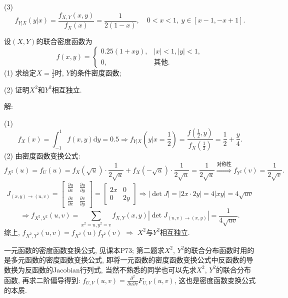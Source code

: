 \documentclass[standard]{ExBook}
\renewenvironment{shaded}{%
  \def\FrameCommand{\fboxsep=\FrameSep \colorbox{shadecolor}}%
  \MakeFramed{\advance\hsize-\width \FrameRestore}%
}{%
  \endMakeFramed
}
\begin{document}
\begin{qitems}
(3) $$f_{Y|X}(y|x)=\frac{f_{X,Y}(x,y)}{f_{X}(x)}=\frac{1}{2(1-x)},\quad 0<x<1,\ y\in[x-1,-x+1].$$

\vspace{2.5cm-5em}

    \begin{bbox}
    \begin{shaded}
        \qitem
设$(X,Y)$的联合密度函数为
$$
    f(x,y)=
    \left\{
    \begin{array}{ll}
        0.25(1+xy), &|x|<1,|y|<1,\\
        0, & \text{其他}.
    \end{array}
    \right.
$$
(1) 求给定$X=\displaystyle\frac{1}{2}$时, $Y$的条件密度函数;

(2) 证明$X^2$和$Y^2$相互独立.
    \end{shaded}
    \end{bbox}

\vspace{\dimexpr2.5cm-5em\relax}

解: 

(1)
$$f_{X}(x)=\int_{-1}^{1}f(x,y)\mathrm{d}y=0.5 \Longrightarrow f_{Y|X}(y|x=\frac{1}{2})=\frac{f(\frac{1}{2},y)}{f_{X}(\frac{1}{2})}=\frac{1}{2}+\frac{y}{4}.$$
(2) 由密度函数变换公式:
$$f_{X^2}(u)=f_{U}(u)=f_{X}(\sqrt{u})\cdot\frac{1}{2\sqrt{u}}+f_{X}(-\sqrt{u})\cdot\frac{1}{2\sqrt{u}}=\frac{1}{2\sqrt{u}} \overset{\text{对称性}}{\Longrightarrow} f_{Y^2}(v)=\frac{1}{2\sqrt{v}}.$$
\[
J_{(x,y)\to(u,v)} = 
\begin{bmatrix}
\frac{\partial u}{\partial x} & \frac{\partial u}{\partial y} \\
\frac{\partial v}{\partial x} & \frac{\partial v}{\partial y}
\end{bmatrix}
=
\begin{bmatrix}
2x & 0 \\
0 & 2y
\end{bmatrix}
\Longrightarrow |\det J| = |2x \cdot 2y| = 4|xy| = 4\sqrt{uv}
\]
\[
\Longrightarrow
f_{X^2,Y^2}(u,v)=\sum\limits_{x^2=u,y^2=v}f_{X,Y}(x,y)|\det J_{(u,v)\to(x,y)}|=\frac{1}{4\sqrt{uv}}.
\]
综上, $f_{X^2,Y^2}(u,v)=f_{X^2}(u)f_{Y^2}(v)$ $\Longrightarrow$ $X^2$与$Y^2$相互独立.

\textcolor{themeColor}{\selectfont {} 一元函数的密度函数变换公式, 见课本P73; 第二题求$X^2$, $Y^2$的联合分布函数时用的是多元函数的密度函数变换公式, 即将一元函数的密度函数变换公式中反函数的导数换为反函数的Jacobian行列式, 当然不熟悉的同学也可以先求$X^2$, $Y^2$的联合分布函数, 再求二阶偏导得到: $f_{U,V}(u,v)=\frac{\partial^2}{\partial u\partial v}F_{U,V}(u,v)$, 这也是密度函数变换公式的本质.}


\end{qitems}
\end{document}
